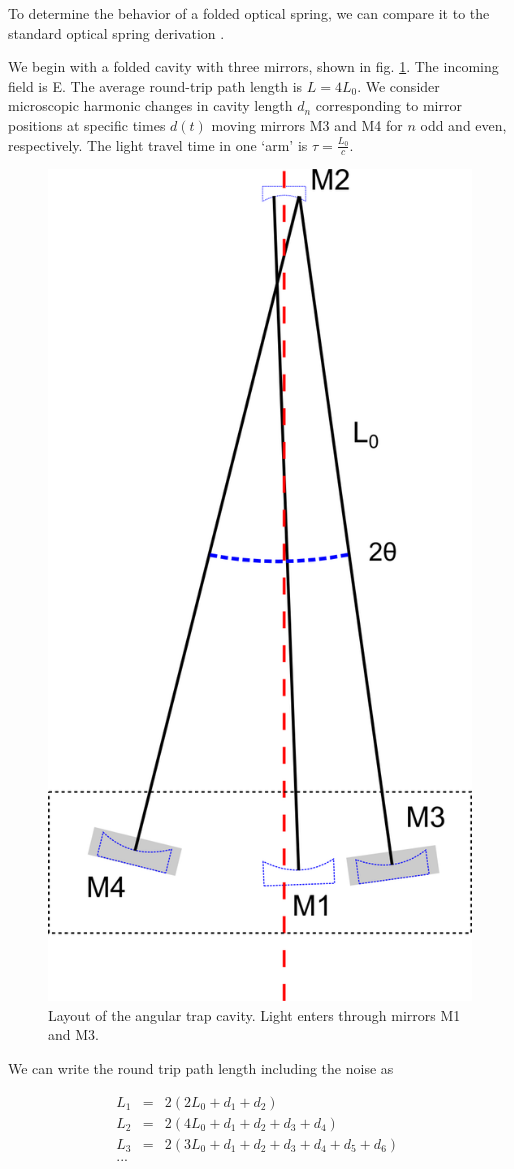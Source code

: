 To determine the behavior of a folded optical spring, we can compare it to the standard optical spring derivation \cite{Perreca14}.

We begin with a folded cavity with three mirrors, shown in fig. \ref{f:angularLayout}. The incoming field is E. The average round-trip path length is $L = 4L_0$. We consider microscopic harmonic changes in cavity length $d_n$ corresponding to mirror positions at specific times $d(t)$ moving mirrors M3 and M4 for $n$ odd and even, respectively. The light travel time in one `arm' is $\tau = \frac{L_0}{c}$.

\begin{figure}[p]
\vspace{5pt}
\begin{center}
\includegraphics[width=.5\textwidth]{figures/angular/angularLayout}
\end{center}
\caption[Folded cavity layout]{%
\label{f:angularLayout}
Layout of the angular trap cavity. Light enters through mirrors M1 and M3.
}
\end{figure}

We can write the round trip path length including the noise as

\begin{eqnarray}
L_1&=&2(2L_0+d_1+d_2)\\
L_2&=&2(4L_0+d_1+d_2+d_3+d_4)\nonumber\\
L_3&=&2(3L_0+d_1+d_2+d_3+d_4+d_5+d_6)\,\, \nonumber\\
...\nonumber
\label{e:L}
\end{eqnarray}



